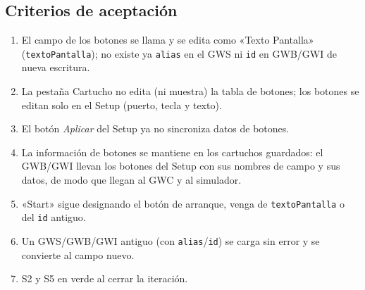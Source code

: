 \subsection{Criterios de aceptación}
\label{sec:F5I22Criterios}

\begin{enumerate}
	\item El campo de los botones se llama y se edita como «Texto Pantalla» (\texttt{textoPantalla}); no existe ya \texttt{alias} en el GWS ni \texttt{id} en GWB/GWI de nueva escritura.
	\item La pestaña Cartucho no edita (ni muestra) la tabla de botones; los botones se editan solo en el Setup (puerto, tecla y texto).
	\item El botón \emph{Aplicar} del Setup ya no sincroniza datos de botones.
	\item La información de botones se mantiene en los cartuchos guardados: el GWB/GWI llevan los botones del Setup con sus nombres de campo y sus datos, de modo que llegan al GWC y al simulador.
	\item «Start» sigue designando el botón de arranque, venga de \texttt{textoPantalla} o del \texttt{id} antiguo.
	\item Un GWS/GWB/GWI antiguo (con \texttt{alias}/\texttt{id}) se carga sin error y se convierte al campo nuevo.
	\item S2 y S5 en verde al cerrar la iteración.
\end{enumerate}
